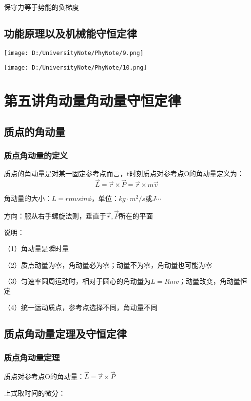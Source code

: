 \documentclass[UTF8]{article}
\begin{document}
    保守力等于势能的负梯度

\subsection{功能原理以及机械能守恒定律}

    \texttt{[image: D:/UniversityNote/PhyNote/9.png]}

    \texttt{[image: D:/UniversityNote/PhyNote/10.png]}

\newpage
\section{第五讲\;\;角动量\;\;角动量守恒定律}
\subsection{质点的角动量}
\subsubsection{质点角动量的定义}

    质点的角动量是对某一固定参考点而言，t时刻质点对参考点O的角动量定义为：
    \[\vec{L} = \vec{r}\times\vec{P} = \vec{r}\times m\vec{v}\]

    角动量的大小：$L = rmvsin\phi$，单位：$kg\cdot m^2/s$或$J\cdots$

    方向：服从右手螺旋法则，垂直于$\vec{r},\vec{P}$所在的平面

    说明：

    （1）角动量是瞬时量

    （2）质点动量为零，角动量必为零；动量不为零，角动量也可能为零

    （3）匀速率圆周运动时，相对于圆心的角动量为$L = Rmv$；动量改变，角动量恒定

    （4）统一运动质点，参考点选择不同，角动量不同

\subsection{质点角动量定理及守恒定律}
\subsubsection{质点角动量定理}

    质点对参考点O的角动量：$\vec{L} = \vec{r}\times\vec{P}$

    上式取时间的微分：
    
\end{document}
